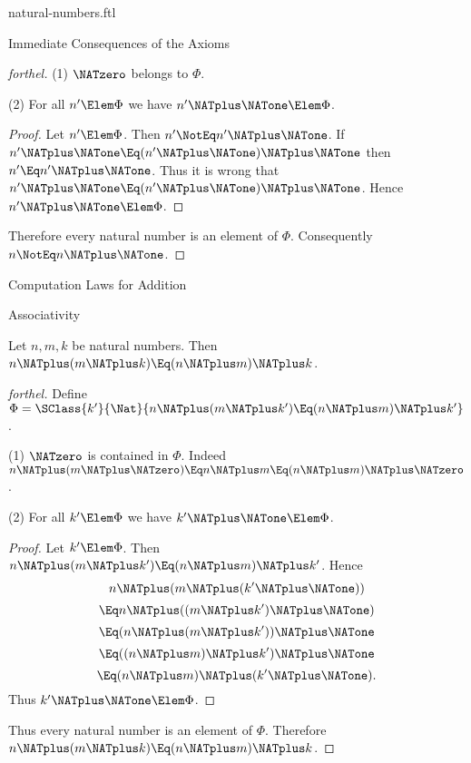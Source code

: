\documentclass{stex}
\begin{document}
\begin{smodule}{natural-numbers.ftl}
\begin{sfragment}{Immediate Consequences of the Axioms}
\begin{proof}[forthel]
    (1) $\NATzero$ belongs to $\Phi$.

    (2) For all $n' \Elem \Phi$ we have $n' \NATplus \NATone \Elem \Phi$.
    \begin{proof}
      Let $n' \Elem \Phi$.
      Then $n' \NotEq n' \NATplus \NATone$.
      If $n' \NATplus \NATone \Eq (n' \NATplus \NATone) \NATplus \NATone$ then $n' \Eq n' \NATplus \NATone$.
      Thus it is wrong that $n' \NATplus \NATone \Eq (n' \NATplus \NATone) \NATplus \NATone$.
      Hence $n' \NATplus \NATone \Elem \Phi$.
    \end{proof}

    Therefore every natural number is an element of $\Phi$.
    Consequently $n \NotEq n \NATplus \NATone$.
  \end{proof}
\end{sfragment}

\begin{sfragment}{Computation Laws for Addition}
  \begin{sfragment}{Associativity}
    \begin{proposition}[forthel,id=ARITHMETIC_03_3235893452210176]
      Let $n, m, k$ be natural numbers.
      Then $n \NATplus (m \NATplus k) \Eq (n \NATplus m) \NATplus k$.
    \end{proposition}
    \begin{proof}[forthel]
      Define $\Phi = \SClass{k'}{\Nat}{n \NATplus (m \NATplus k') \Eq (n \NATplus m) \NATplus k'}$.

      (1) $\NATzero$ is contained in $\Phi$.
      Indeed $n \NATplus (m \NATplus \NATzero) \Eq n \NATplus m \Eq (n \NATplus m) \NATplus \NATzero$.

      (2) For all $k' \Elem \Phi$ we have $k' \NATplus \NATone \Elem \Phi$.
      \begin{proof}
        Let $k' \Elem \Phi$.
        Then $n \NATplus (m \NATplus k') \Eq (n \NATplus m) \NATplus k'$.
        Hence
        \[  n \NATplus (m \NATplus (k' \NATplus \NATone))        \]
        \[    \Eq n \NATplus ((m \NATplus k') \NATplus \NATone)    \]
        \[    \Eq (n \NATplus (m \NATplus k')) \NATplus \NATone    \]
        \[    \Eq ((n \NATplus m) \NATplus k') \NATplus \NATone    \]
        \[    \Eq (n \NATplus m) \NATplus (k' \NATplus \NATone).   \]
        Thus $k' \NATplus \NATone \Elem \Phi$.
      \end{proof}

      Thus every natural number is an element of $\Phi$.
      Therefore $n \NATplus (m \NATplus k) \Eq (n \NATplus m) \NATplus k$.
    \end{proof}
  \end{sfragment}


\end{sfragment}
\end{smodule}
\end{document}
